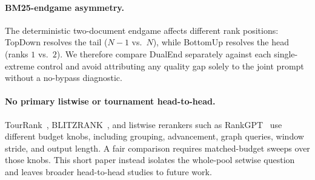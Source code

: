 \paragraph{BM25-endgame asymmetry.}
The deterministic two-document endgame affects different rank positions:
TopDown resolves the tail ($N{-}1$ vs.\ $N$), while BottomUp resolves the
head (ranks $1$ vs.\ $2$). We therefore compare DualEnd separately
against each single-extreme control and avoid attributing any quality gap
solely to the joint prompt without a no-bypass diagnostic.

\paragraph{No primary listwise or tournament head-to-head.}
TourRank~\citep{chen2025tourrank}, BLITZRANK~\citep{blitzrank2026}, and
listwise rerankers such as RankGPT~\citep{sun2023rankgpt} use different
budget knobs, including grouping, advancement, graph queries, window
stride, and output length. A fair comparison requires matched-budget
sweeps over those knobs. This short paper instead isolates the
whole-pool setwise question and leaves broader head-to-head studies to
future work.
